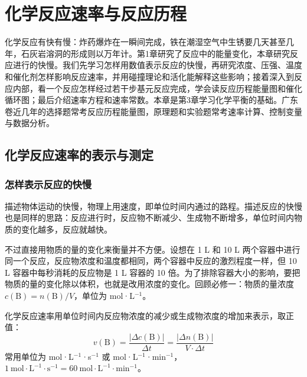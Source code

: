 \chapter{化学反应速率与反应历程}

化学反应有快有慢：炸药爆炸在一瞬间完成，铁在潮湿空气中生锈要几天甚至几年，石灰岩溶洞的形成则以万年计。第1章研究了反应中的能量变化，本章研究反应进行的快慢。我们先学习怎样用数值表示反应的快慢，再研究浓度、压强、温度和催化剂怎样影响反应速率，并用碰撞理论和活化能解释这些影响；接着深入到反应内部，看一个反应怎样经过若干步基元反应完成，学会读反应历程能量图和催化循环图；最后介绍速率方程和速率常数。本章是第3章学习化学平衡的基础。广东卷近几年的选择题常考反应历程能量图，原理题和实验题常考速率计算、控制变量与数据分析。

\section{化学反应速率的表示与测定}

\subsection{怎样表示反应的快慢}

描述物体运动的快慢，物理上用速度，即单位时间内通过的路程。描述反应的快慢也是同样的思路：反应进行时，反应物不断减少、生成物不断增多，单位时间内物质的变化越多，反应就越快。

不过直接用物质的量的变化来衡量并不方便。设想在 1 L 和 10 L 两个容器中进行同一个反应，反应物浓度和温度都相同，两个容器中反应的激烈程度一样，但 10 L 容器中每秒消耗的反应物是 1 L 容器的 10 倍。为了排除容器大小的影响，要把物质的量的变化除以体积，也就是改用浓度的变化。回顾必修一：物质的量浓度 $c(\mathrm{B})=n(\mathrm{B})/V$，单位为 mol·L$^{-1}$。

\begin{gainian}[化学反应速率]
化学反应速率用单位时间内反应物浓度的减少或生成物浓度的增加来表示，取正值：
\[v(\mathrm{B})=\frac{|\Delta c(\mathrm{B})|}{\Delta t}=\frac{|\Delta n(\mathrm{B})|}{V\cdot\Delta t}\]
常用单位为 mol·L$^{-1}$·s$^{-1}$ 或 mol·L$^{-1}$·min$^{-1}$，$1\ \mathrm{mol\cdot L^{-1}\cdot s^{-1}}=60\ \mathrm{mol\cdot L^{-1}\cdot min^{-1}}$。
\end{gainian}

